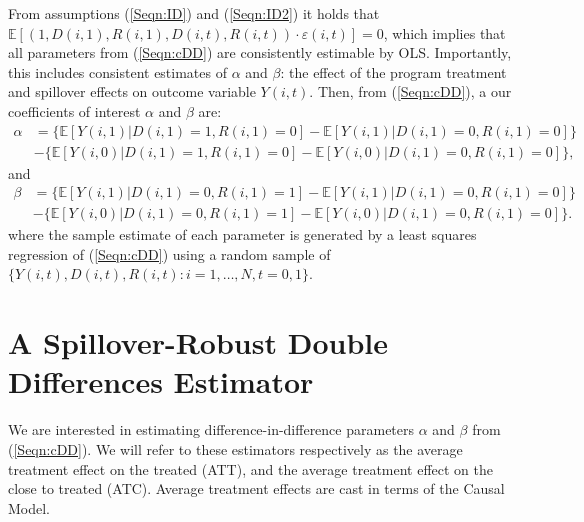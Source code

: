 \documentclass{article}
\begin{document}
\begin{spacing}{1.3}
From assumptions (\ref{Seqn:ID}) and (\ref{Seqn:ID2}) it holds that $\mathbb{E}[(1,D(i,1),R(i,1),
D(i,t),R(i,t))\cdot\varepsilon(i,t)]=0$, which implies that all parameters from
(\ref{Seqn:cDD}) are consistently estimable by OLS.  Importantly, this includes
consistent estimates of $\alpha$ and $\beta$: the effect of the program treatment 
and spillover effects on outcome variable $Y(i,t)$.  Then, from (\ref{Seqn:cDD}),
a our coefficients of interest $\alpha$ and $\beta$ are:
\begin{equation}
\nonumber
\label{Seqn:DDa}
\begin{split}
\alpha&=\{\mathbb{E}[Y(i,1)|D(i,1)=1,R(i,1)=0]-\mathbb{E}[Y(i,1)|D(i,1)=0,R(i,1)=0]\} \\
      &-\{\mathbb{E}[Y(i,0)|D(i,1)=1,R(i,1)=0]-\mathbb{E}[Y(i,0)|D(i,1)=0,R(i,1)=0]\}, 
\end{split}
\end{equation}
and 
\begin{equation}
\nonumber
\label{Seqn:DDb}
\begin{split}
\beta&=\{\mathbb{E}[Y(i,1)|D(i,1)=0,R(i,1)=1]-\mathbb{E}[Y(i,1)|D(i,1)=0,R(i,1)=0]\} \\
      &-\{\mathbb{E}[Y(i,0)|D(i,1)=0,R(i,1)=1]-\mathbb{E}[Y(i,0)|D(i,1)=0,R(i,1)=0]\}. 
\end{split}
\end{equation}
where the sample estimate of each parameter is generated by a least squares
regression of (\ref{Seqn:cDD}) using a random sample of 
$\{Y(i,t), D(i,t), R(i,t): i=1, \ldots, N, t=0, 1\}$.

\section{A Spillover-Robust Double Differences Estimator}
\label{Sscn:estim}
We are interested in estimating difference-in-difference parameters $\alpha$ and 
$\beta$ from (\ref{Seqn:cDD}).  We will refer to these estimators respectively
as the average treatment effect on the treated (ATT), and the average treatment
effect on the close to treated (ATC).  Average treatment effects are cast in 
terms of the \citet{Rubin1974} Causal Model.


\end{spacing}
\end{document}
